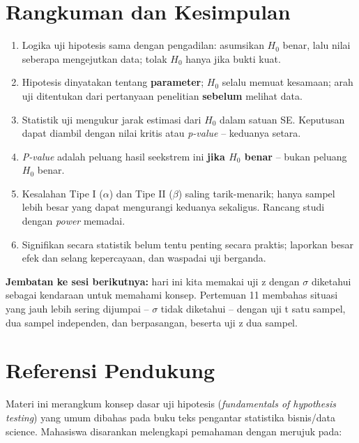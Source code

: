 \documentclass[
  indonesian,
  letterpaper,
]{book}
\providecommand{\tightlist}{%
  \setlength{\itemsep}{0pt}\setlength{\parskip}{0pt}}
\begin{document}

\chapter{Rangkuman dan Kesimpulan}\label{rangkuman-dan-kesimpulan-1}

\begin{enumerate}
\def\labelenumi{\arabic{enumi}.}
\tightlist
\item
  Logika uji hipotesis sama dengan pengadilan: asumsikan \(H_0\) benar,
  lalu nilai seberapa mengejutkan data; tolak \(H_0\) hanya jika bukti
  kuat.
\item
  Hipotesis dinyatakan tentang \textbf{parameter}; \(H_0\) selalu memuat
  kesamaan; arah uji ditentukan dari pertanyaan penelitian
  \textbf{sebelum} melihat data.
\item
  Statistik uji mengukur jarak estimasi dari \(H_0\) dalam satuan SE.
  Keputusan dapat diambil dengan nilai kritis atau \emph{p-value} --
  keduanya setara.
\item
  \emph{P-value} adalah peluang hasil seekstrem ini \textbf{jika \(H_0\)
  benar} -- bukan peluang \(H_0\) benar.
\item
  Kesalahan Tipe I (\(\alpha\)) dan Tipe II (\(\beta\)) saling
  tarik-menarik; hanya sampel lebih besar yang dapat mengurangi keduanya
  sekaligus. Rancang studi dengan \emph{power} memadai.
\item
  Signifikan secara statistik belum tentu penting secara praktis;
  laporkan besar efek dan selang kepercayaan, dan waspadai uji berganda.
\end{enumerate}

\textbf{Jembatan ke sesi berikutnya:} hari ini kita memakai uji z dengan
\(\sigma\) diketahui sebagai kendaraan untuk memahami konsep. Pertemuan
11 membahas situasi yang jauh lebih sering dijumpai -- \(\sigma\) tidak
diketahui -- dengan uji t satu sampel, dua sampel independen, dan
berpasangan, beserta uji z dua sampel.


\chapter{Referensi Pendukung}\label{referensi-pendukung-1}

Materi ini merangkum konsep dasar uji hipotesis (\emph{fundamentals of
hypothesis testing}) yang umum dibahas pada buku teks pengantar
statistika bisnis/data science. Mahasiswa disarankan melengkapi
pemahaman dengan merujuk pada:
\end{document}
